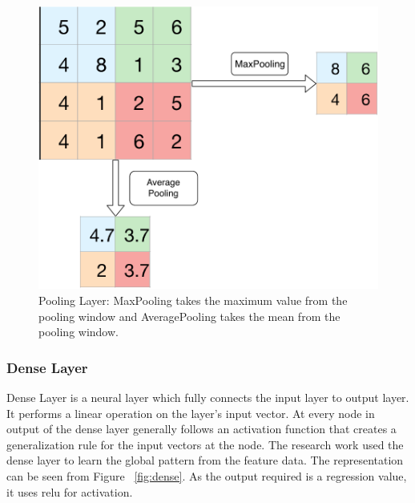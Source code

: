   \begin{figure}[H] \centering
    \includegraphics[width=.5\linewidth]{mainmatter/3-Methodology/images/pooling.pdf}
    \caption[Pooling Layer]{Pooling Layer: MaxPooling takes the maximum value from the pooling window and AveragePooling takes the mean from the pooling window.}
    \label{fig:pool_layer}
  \end{figure}

  \subsubsection{Dense Layer}
  Dense Layer is a neural layer which fully connects the input layer to output layer. It performs a linear operation on the layer's input vector. At every node in output of the dense layer generally follows an activation function that creates a generalization rule for the input vectors at the node. The research work used the dense layer to learn the global pattern from the feature data. The representation can be seen from Figure ~\ref{fig:dense}. As the output required is a regression value, it uses relu for activation.

  
  
